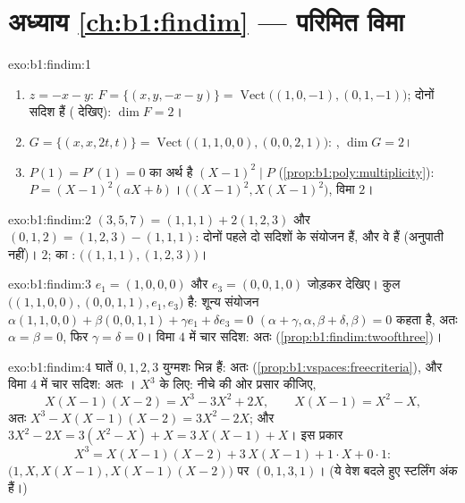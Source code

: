 \section*{अध्याय \ref{ch:b1:findim} --- परिमित विमा}

\begin{solution}{exo:b1:findim:1}
\begin{enumerate}
  \item $z = -x - y$: $F = \{(x, y, -x-y)\} =
  \operatorname{Vect}\bigl((1,0,-1), (0,1,-1)\bigr)$; दोनों सदिश 
  हैं ( देखिए): $\dim F = 2$।
  \item $G = \{(x, x, 2t, t)\} = \operatorname{Vect}\bigl((1,1,0,0),
  (0,0,2,1)\bigr)$: , $\dim G = 2$।
  \item $P(1) = P'(1) = 0$ का अर्थ है $(X-1)^2 \mid P$
  (\cref{prop:b1:poly:multiplicity}): $P = (X-1)^2(aX + b)$। 
  $\bigl((X-1)^2, X(X-1)^2\bigr)$, विमा $2$।
\end{enumerate}
\end{solution}

\begin{solution}{exo:b1:findim:2}
$(3,5,7) = (1,1,1) + 2(1,2,3)$ और $(0,1,2) = (1,2,3) - (1,1,1)$: दोनों पहले
दो सदिशों के संयोजन हैं, और वे  हैं (अनुपाती नहीं)।  $2$;  का : $\bigl((1,1,1), (1,2,3)\bigr)$।
\end{solution}

\begin{solution}{exo:b1:findim:3}
$e_1 = (1,0,0,0)$ और $e_3 = (0,0,1,0)$ जोड़कर देखिए। कुल $\bigl((1,1,0,0),
(0,0,1,1), e_1, e_3\bigr)$  है: शून्य संयोजन $\alpha(1,1,0,0) +
\beta(0,0,1,1) + \gamma e_1 + \delta e_3 = 0$ $(\alpha + \gamma, \alpha,
\beta + \delta, \beta) = 0$ कहता है, अतः $\alpha = \beta = 0$, फिर $\gamma =
\delta = 0$। विमा $4$ में चार  सदिश: अतः 
(\cref{prop:b1:findim:twoofthree})।
\end{solution}

\begin{solution}{exo:b1:findim:4}
घातें $0, 1, 2, 3$ युग्मशः भिन्न हैं: अतः 
(\cref{prop:b1:vspaces:freecriteria}), और विमा $4$ में चार सदिश: अतः ।
$X^3$ के लिए: नीचे की ओर प्रसार कीजिए,
\[
X(X-1)(X-2) = X^3 - 3X^2 + 2X,
\qquad
X(X-1) = X^2 - X,
\]
अतः $X^3 - X(X-1)(X-2) = 3X^2 - 2X$; और $3X^2 - 2X = 3(X^2 - X) + X =
3\,X(X-1) + X$। इस प्रकार
\[
X^3 = X(X-1)(X-2) + 3\,X(X-1) + 1\cdot X + 0\cdot 1 :
\]
$\bigl(1, X, X(X-1), X(X-1)(X-2)\bigr)$ पर  $(0, 1, 3, 1)$। (ये
वेश बदले हुए स्टर्लिंग अंक हैं।)
\end{solution}

